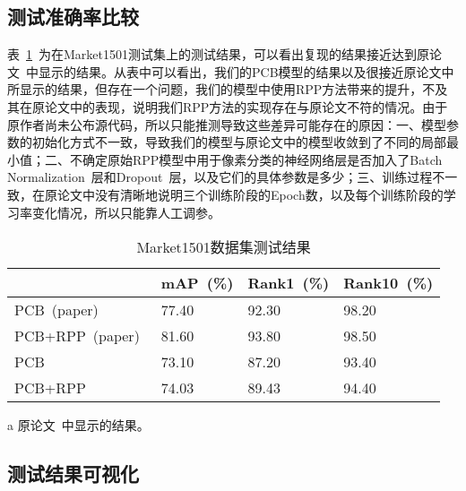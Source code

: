 \subsection{测试准确率比较}

表~\ref{tab:test}~为在Market1501测试集上的测试结果，可以看出复现的结果接近达到原论文~\cite{sun2017beyond}中显示的结果。从表中可以看出，我们的PCB模型的结果以及很接近原论文中所显示的结果，但存在一个问题，我们的模型中使用RPP方法带来的提升，不及其在原论文中的表现，说明我们RPP方法的实现存在与原论文不符的情况。由于原作者尚未公布源代码，所以只能推测导致这些差异可能存在的原因：一、模型参数的初始化方式不一致，导致我们的模型与原论文中的模型收敛到了不同的局部最小值；二、不确定原始RPP模型中用于像素分类的神经网络层是否加入了Batch Normalization~\cite{ioffe2015batch}层和Dropout~\cite{srivastava2014dropout}层，以及它们的具体参数是多少；三、训练过程不一致，在原论文中没有清晰地说明三个训练阶段的Epoch数，以及每个训练阶段的学习率变化情况，所以只能靠人工调参。

\begin{table}[!ht]
    \centering
    \caption{Market1501数据集测试结果}
    \label{tab:test}
    \begin{threeparttable}
    \begin{tabularx}{\textwidth}{p{}p{}<{\centering}p{}<{\centering}p{}<{\centering}}
    \toprule
                            & mAP~(\%)   & Rank1~(\%) & Rank10~(\%) \\ \midrule
    PCB~(paper)~\tnote{a}    & 77.40  & 92.30  & 98.20   \\
    PCB+RPP~(paper)~\tnote{a}& 81.60  & 93.80  & 98.50   \\
    PCB                      & 73.10  & 87.20  & 93.40   \\
    PCB+RPP                  & 74.03  & 89.43  & 94.40   \\ \bottomrule
    \end{tabularx}
    \begin{tablenotes}
        \footnotesize
        \item[a] 原论文~\cite{sun2017beyond}中显示的结果。
    \end{tablenotes}
    \end{threeparttable}

\end{table}

\subsection{测试结果可视化}

